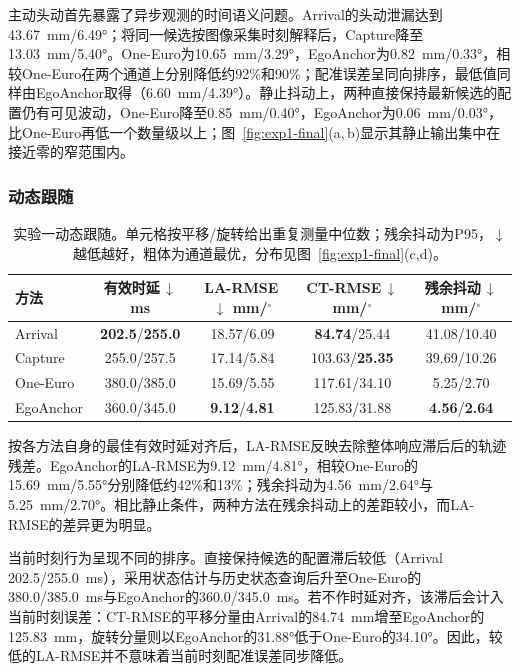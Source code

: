 \documentclass[review]{vgtc}
\begin{document}
主动头动首先暴露了异步观测的时间语义问题。Arrival的头动泄漏达到43.67~mm/6.49°；将同一候选按图像采集时刻解释后，Capture降至13.03~mm/5.40°。One-Euro为10.65~mm/3.29°，EgoAnchor为0.82~mm/0.33°，相较One-Euro在两个通道上分别降低约92\%和90\%；配准误差呈同向排序，最低值同样由EgoAnchor取得（6.60~mm/4.39°）。静止抖动上，两种直接保持最新候选的配置仍有可见波动，One-Euro降至0.85~mm/0.40°，EgoAnchor为0.06~mm/0.03°，比One-Euro再低一个数量级以上；图~\ref{fig:exp1-final}(a,\,b)显示其静止输出集中在接近零的窄范围内。

\subsubsection{动态跟随}

\begin{table}[t]
\centering
\caption{实验一动态跟随。单元格按平移/旋转给出重复测量中位数；残余抖动为P95，$\downarrow$越低越好，粗体为通道最优，分布见图~\ref{fig:exp1-final}(c,d)。}
\label{tab:exp1-dynamic}
\setlength{\tabcolsep}{2pt}
\begin{tabular}{@{}lcccc@{}}
\toprule
方法 & \shortstack{有效时延\,$\downarrow$\\ms} & \shortstack{LA-RMSE\,$\downarrow$\\mm/$^\circ$} & \shortstack{CT-RMSE\,$\downarrow$\\mm/$^\circ$} & \shortstack{残余抖动\,$\downarrow$\\mm/$^\circ$} \\
\midrule
Arrival & \textbf{202.5}/\textbf{255.0} & 18.57/6.09 & \textbf{84.74}/25.44 & 41.08/10.40 \\
Capture & 255.0/257.5 & 17.14/5.84 & 103.63/\textbf{25.35} & 39.69/10.26 \\
One-Euro & 380.0/385.0 & 15.69/5.55 & 117.61/34.10 & 5.25/2.70 \\
EgoAnchor & 360.0/345.0 & \textbf{9.12}/\textbf{4.81} & 125.83/31.88 & \textbf{4.56}/\textbf{2.64} \\
\bottomrule
\end{tabular}
\end{table}

按各方法自身的最佳有效时延对齐后，LA-RMSE反映去除整体响应滞后后的轨迹残差。EgoAnchor的LA-RMSE为9.12~mm/4.81°，相较One-Euro的15.69~mm/5.55°分别降低约42\%和13\%；残余抖动为4.56~mm/2.64°与5.25~mm/2.70°。相比静止条件，两种方法在残余抖动上的差距较小，而LA-RMSE的差异更为明显。

当前时刻行为呈现不同的排序。直接保持候选的配置滞后较低（Arrival 202.5/255.0~ms），采用状态估计与历史状态查询后升至One-Euro的380.0/385.0~ms与EgoAnchor的360.0/345.0~ms。若不作时延对齐，该滞后会计入当前时刻误差：CT-RMSE的平移分量由Arrival的84.74~mm增至EgoAnchor的125.83~mm，旋转分量则以EgoAnchor的31.88°低于One-Euro的34.10°。因此，较低的LA-RMSE并不意味着当前时刻配准误差同步降低。
\end{document}

